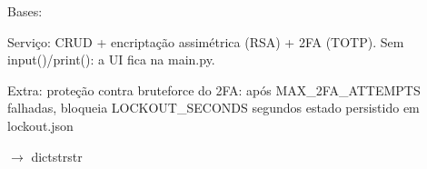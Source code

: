 \documentclass[letterpaper,10pt,english]{sphinxmanual}
\begin{document}
\begin{fulllineitems}
\label{\detokenize{modules:modules.password_manager.PasswordManager}}
\pysigstartsignatures
\pysiglinewithargsret
{}
{}
{}
\pysigstopsignatures
\sphinxAtStartPar
Bases: 

\sphinxAtStartPar
Serviço: CRUD + encriptação assimétrica (RSA) + 2FA (TOTP).
Sem input()/print(): a UI fica na main.py.

\sphinxAtStartPar
Extra: proteção contra brute\sphinxhyphen{}force do 2FA:
\sphinxhyphen{} após MAX\_2FA\_ATTEMPTS falhadas, bloqueia LOCKOUT\_SECONDS segundos
\sphinxhyphen{} estado persistido em lockout.json

\begin{fulllineitems}
\label{\detokenize{modules:modules.password_manager.PasswordManager.LOCKOUT_SECONDS}}
\pysigstartsignatures
\pysigline
{}
\pysigstopsignatures
\end{fulllineitems}


\begin{fulllineitems}
\label{\detokenize{modules:modules.password_manager.PasswordManager.MAX_2FA_ATTEMPTS}}
\pysigstartsignatures
\pysigline
{}
\pysigstopsignatures
\end{fulllineitems}


\begin{fulllineitems}
\label{\detokenize{modules:modules.password_manager.PasswordManager.consult_password}}
\pysigstartsignatures
\pysiglinewithargsret
{}
{\sphinxparamcomma {}\sphinxparamcomma {}}
{{ $\rightarrow$ dict\DUrole{p}{{[}}strstr\DUrole{p}{{]}}}}
\pysigstopsignatures
\end{fulllineitems}


\end{fulllineitems}
\end{document}
